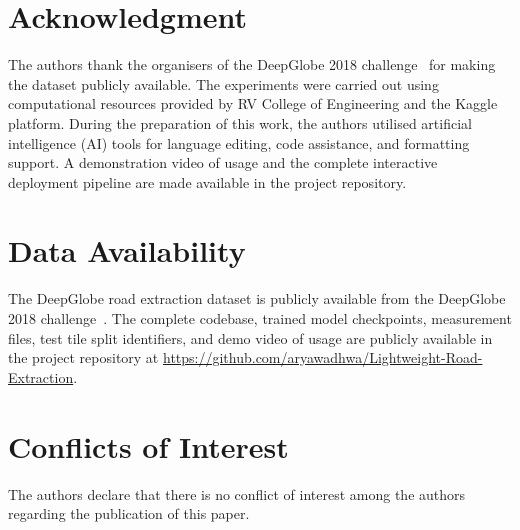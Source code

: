 \documentclass{ieeeaccess}
\begin{document}
\section*{Acknowledgment}

The authors thank the organisers of the DeepGlobe 2018 challenge~\cite{demir2018deepglobe} for making the dataset publicly available. The experiments were carried out using computational resources provided by RV College of Engineering and the Kaggle platform. During the preparation of this work, the authors utilised artificial intelligence (AI) tools for language editing, code assistance, and formatting support. A demonstration video of usage and the complete interactive deployment pipeline are made available in the project repository.

\section*{Data Availability}

The DeepGlobe road extraction dataset is publicly available from the DeepGlobe 2018 challenge~\cite{demir2018deepglobe}. The complete codebase, trained model checkpoints, measurement files, test tile split identifiers, and demo video of usage are publicly available in the project repository at \url{https://github.com/aryawadhwa/Lightweight-Road-Extraction}.

\section*{Conflicts of Interest}

The authors declare that there is no conflict of interest among the authors regarding the publication of this paper.
\end{document}
